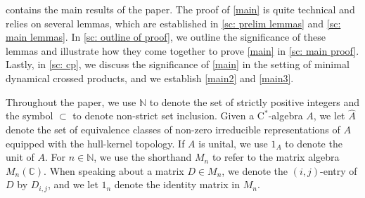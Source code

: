 \documentclass[12pt]{amsart}
\numberwithin{equation}{section}
\theoremstyle{definition}
\theoremstyle{remark}
\newcommand{\diag}{\operatorname{diag}}
\newcommand{\NN}{\mathbb{N}}
\begin{document}
 contains the main results of the paper. The proof of \autoref{main} is quite technical and relies on several lemmas, which are established in \cref{sc: prelim lemmas} and \cref{sc: main lemmas}. In \cref{sc: outline of proof}, we outline the significance of these lemmas and illustrate how they come together to prove \autoref{main} in \cref{sc: main proof}. Lastly, in \cref{sc: cp}, we discuss the significance of \autoref{main} in the setting of minimal dynamical crossed products, and we establish \autoref{main2} and \autoref{main3}. 

Throughout the paper, we use $\mathbb{N}$ to denote the set of strictly positive integers and the symbol $\subset$ to denote non-strict set inclusion. Given a $\mathrm{C}^*$-algebra $A$, we let $\hat{A}$ denote the set of equivalence classes of non-zero irreducible representations of $A$ equipped with the hull-kernel topology. If $A$ is unital, we use $1_{A}$ to denote the unit of $A$. For $n\in\NN$, we use the shorthand $M_{n}$ to refer to the matrix algebra $M_{n}(\mathbb{C})$. When speaking about a matrix $D\in M_{n}$, we denote the $(i,j)$-entry of $D$ by $D_{i,j}$, and we let $1_{n}$ denote the identity matrix in $M_{n}$.



\end{document}
